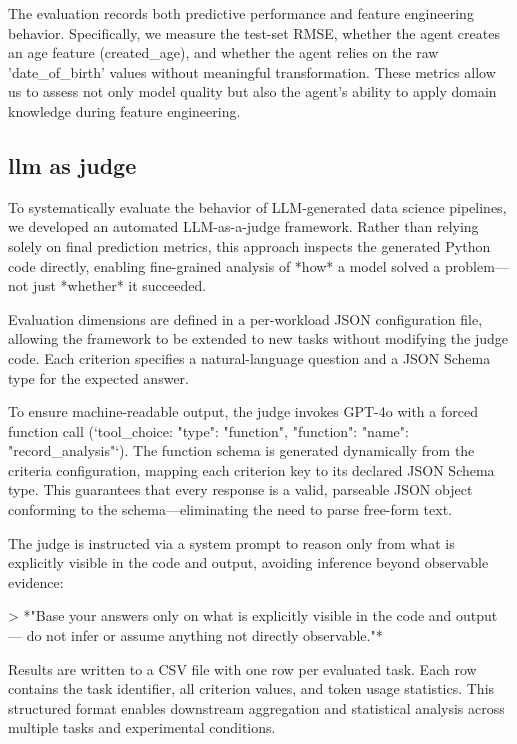 The evaluation records both predictive performance and feature engineering behavior. Specifically, we measure the test-set RMSE, whether the agent creates an age feature (created\_age), and whether the agent relies on the raw 'date\_of\_birth' values without meaningful transformation. These metrics allow us to assess not only model quality but also the agent's ability to apply domain knowledge during feature engineering.


\subsection{llm as judge}\label{llm judge}
To systematically evaluate the behavior of LLM-generated data science pipelines, we developed an automated LLM-as-a-judge framework. Rather than relying solely on final prediction metrics, this approach inspects the generated Python code directly, enabling fine-grained analysis of *how* a model solved a problem—not just *whether* it succeeded.

Evaluation dimensions are defined in a per-workload JSON configuration file, allowing the framework to be extended to new tasks without modifying the judge code. Each criterion specifies a natural-language question and a JSON Schema type for the expected answer.

To ensure machine-readable output, the judge invokes GPT-4o with a forced function call (`tool\_choice: {"type": "function", "function": {"name": "record\_analysis"}}`). The function schema is generated dynamically from the criteria configuration, mapping each criterion key to its declared JSON Schema type. This guarantees that every response is a valid, parseable JSON object conforming to the schema—eliminating the need to parse free-form text.

The judge is instructed via a system prompt to reason only from what is explicitly visible in the code and output, avoiding inference beyond observable evidence:

> *"Base your answers only on what is explicitly visible in the code and output — do not infer or assume anything not directly observable."*

Results are written to a CSV file with one row per evaluated task. Each row contains the task identifier, all criterion values, and token usage statistics. This structured format enables downstream aggregation and statistical analysis across multiple tasks and experimental conditions.


